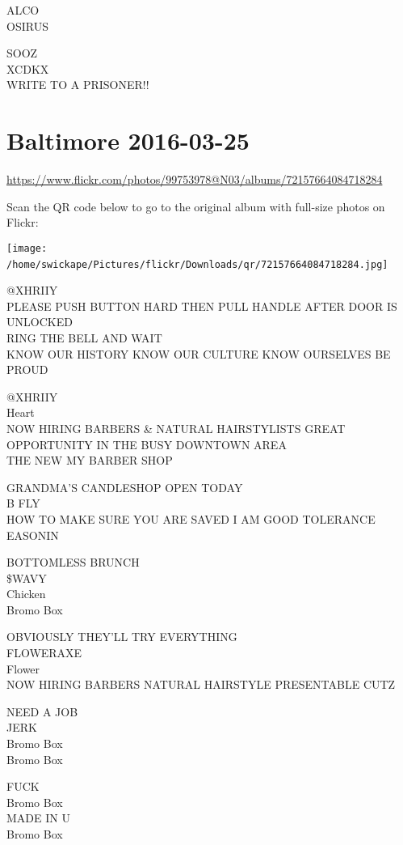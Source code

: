 \documentclass[10pt,letterpaper]{article}
\begin{document}
ALCO\\
OSIRUS

SOOZ\\
XCDKX\\
WRITE TO A PRISONER!!
\

\section*{Baltimore 2016-03-25}

\url{https://www.flickr.com/photos/99753978@N03/albums/72157664084718284}

Scan the QR code below to go to the original album with full-size photos on Flickr:

\texttt{[image: /home/swickape/Pictures/flickr/Downloads/qr/72157664084718284.jpg]}
\

@XHRIIY\\
PLEASE PUSH BUTTON HARD THEN PULL HANDLE AFTER DOOR IS UNLOCKED\\
RING THE BELL AND WAIT\\
KNOW OUR HISTORY KNOW OUR CULTURE KNOW OURSELVES BE PROUD

@XHRIIY\\
Heart\\
NOW HIRING BARBERS \& NATURAL HAIRSTYLISTS GREAT OPPORTUNITY IN THE BUSY DOWNTOWN AREA\\
THE NEW MY BARBER SHOP

GRANDMA'S CANDLESHOP OPEN TODAY\\
B FLY\\
HOW TO MAKE SURE YOU ARE SAVED I AM GOOD TOLERANCE\\
EASONIN

BOTTOMLESS BRUNCH\\
\$WAVY\\
Chicken\\
Bromo Box

OBVIOUSLY THEY'LL TRY EVERYTHING\\
FLOWERAXE\\
Flower\\
NOW HIRING BARBERS NATURAL HAIRSTYLE PRESENTABLE CUTZ

NEED A JOB\\
JERK\\
Bromo Box\\
Bromo Box

FUCK\\
Bromo Box\\
MADE IN U\\
Bromo Box
\end{document}
